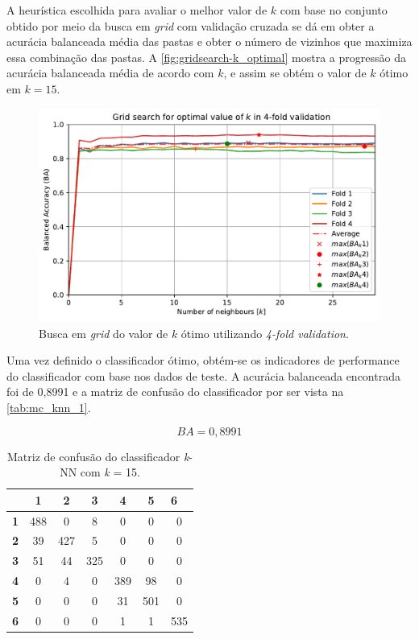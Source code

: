 A heurística escolhida para avaliar o melhor valor de $k$ com base no conjunto obtido por meio da busca em \textit{grid} com validação cruzada se dá em obter a acurácia balanceada média das pastas e obter o número de vizinhos que maximiza essa combinação das pastas. A \autoref{fig:gridsearch-k_optimal} mostra a progressão da acurácia balanceada média de acordo com $k$, e assim se obtém o valor de $k$ ótimo em $k = 15$.

\begin{figure}[H]
	\centering
	\includegraphics[width=0.75\linewidth]{../../plot/knn_1/grid_search_k_fold-k_optimal}
	\caption{Busca em \textit{grid} do valor de $k$ ótimo utilizando \textit{4-fold validation}.}
	\label{fig:gridsearch-k_optimal}
\end{figure}



Uma vez definido o classificador ótimo, obtém-se os indicadores de performance do classificador com base nos dados de teste. A acurácia balanceada encontrada foi de 0,8991 e a matriz de confusão do classificador por ser vista na \autoref{tab:mc_knn_1}.

\begin{equation}\label{eq:ba_knn_1}
	BA = 0,8991
\end{equation}

\begin{table}[H]
	\centering
	\begin{tabular}{c||c|c|c|c|c|c|}
		\cline{2-7}
		& \textbf{1} & \textbf{2} & \textbf{3} & \textbf{4} & \textbf{5} & \multicolumn{1}{l|}{\textbf{6}} \\ \hline \hline
		\multicolumn{1}{|c||}{\textbf{1}} & 488 & 0   & 8   & 0   & 0   & 0   \\ \hline
		\multicolumn{1}{|c||}{\textbf{2}} & 39  & 427 & 5   & 0   & 0   & 0   \\ \hline
		\multicolumn{1}{|c||}{\textbf{3}} & 51  & 44  & 325 & 0   & 0   & 0   \\ \hline
		\multicolumn{1}{|c||}{\textbf{4}} & 0   & 4   & 0   & 389 & 98  & 0   \\ \hline
		\multicolumn{1}{|c||}{\textbf{5}} & 0   & 0   & 0   & 31  & 501 & 0   \\ \hline
		\multicolumn{1}{|c||}{\textbf{6}} & 0   & 0   & 0   & 1   & 1   & 535 \\ \hline
	\end{tabular}
	\caption{Matriz de confusão do classificador \textit{k}-NN com \textit{k} = 15.}
	\label{tab:mc_knn_1}
\end{table}

